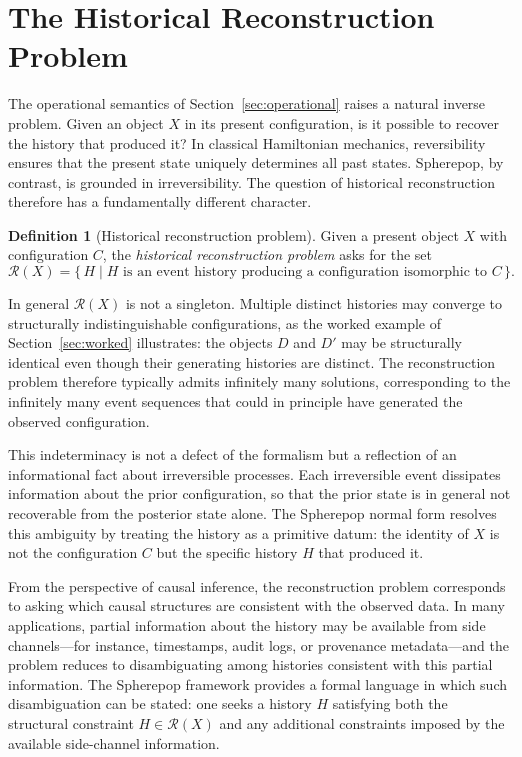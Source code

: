 \documentclass[12pt]{article}
\theoremstyle{plain}
\theoremstyle{definition}
\newtheorem{definition}[theorem]{Definition}
\theoremstyle{remark}
\begin{document}
\section{The Historical Reconstruction Problem}
\label{sec:reconstruction}

The operational semantics of Section~\ref{sec:operational} raises a natural
inverse problem.  Given an object $X$ in its present configuration, is it
possible to recover the history that produced it?  In classical Hamiltonian
mechanics, reversibility ensures that the present state uniquely determines
all past states.  Spherepop, by contrast, is grounded in irreversibility.
The question of historical reconstruction therefore has a fundamentally
different character.

\begin{definition}[Historical reconstruction problem]
Given a present object $X$ with configuration $C$, the \emph{historical
reconstruction problem} asks for the set
\[
  \mathcal{R}(X) = \{\,H \mid H \text{ is an event history producing a
  configuration isomorphic to } C\,\}.
\]
\end{definition}

In general $\mathcal{R}(X)$ is not a singleton.  Multiple distinct histories
may converge to structurally indistinguishable configurations, as the
worked example of Section~\ref{sec:worked} illustrates: the objects $D$ and
$D'$ may be structurally identical even though their generating histories are
distinct.  The reconstruction problem therefore typically admits infinitely
many solutions, corresponding to the infinitely many event sequences that
could in principle have generated the observed configuration.

This indeterminacy is not a defect of the formalism but a reflection of an
informational fact about irreversible processes.  Each irreversible event
dissipates information about the prior configuration, so that the prior state
is in general not recoverable from the posterior state alone.  The Spherepop
normal form resolves this ambiguity by treating the history as a primitive
datum: the identity of $X$ is not the configuration $C$ but the specific
history $H$ that produced it.

From the perspective of causal inference, the reconstruction problem
corresponds to asking which causal structures are consistent with the observed
data.  In many applications, partial information about the history may be
available from side channels---for instance, timestamps, audit logs, or
provenance metadata---and the problem reduces to disambiguating among histories
consistent with this partial information.  The Spherepop framework provides
a formal language in which such disambiguation can be stated: one seeks a
history $H$ satisfying both the structural constraint $H \in \mathcal{R}(X)$
and any additional constraints imposed by the available side-channel information.
\end{document}
